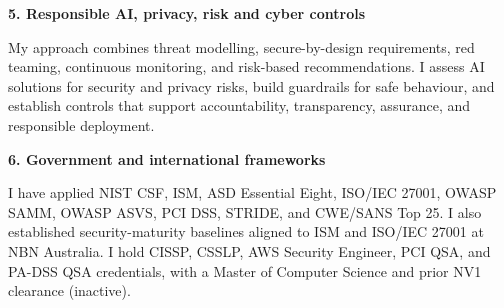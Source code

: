 \documentclass[a4paper,10pt]{article}
\begin{document}
\textbf{5. Responsible AI, privacy, risk and cyber controls}\par
My approach combines threat modelling, secure-by-design requirements, red teaming, continuous monitoring, and risk-based recommendations. I assess AI solutions for security and privacy risks, build guardrails for safe behaviour, and establish controls that support accountability, transparency, assurance, and responsible deployment.

\textbf{6. Government and international frameworks}\par
I have applied NIST CSF, ISM, ASD Essential Eight, ISO/IEC 27001, OWASP SAMM, OWASP ASVS, PCI DSS, STRIDE, and CWE/SANS Top 25. I also established security-maturity baselines aligned to ISM and ISO/IEC 27001 at NBN Australia. I hold CISSP, CSSLP, AWS Security Engineer, PCI QSA, and PA-DSS QSA credentials, with a Master of Computer Science and prior NV1 clearance (inactive).
\end{document}
